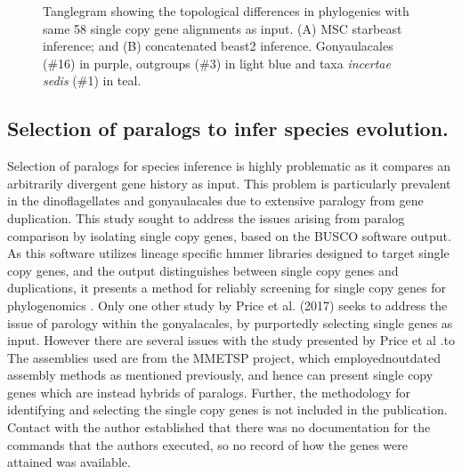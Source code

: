 \documentclass[12pt]{article}
\begin{document}

\begin{figure} 
\caption{Tanglegram showing the topological differences in phylogenies with same 58 single copy gene alignments as input. (A) MSC starbeast inference; and (B) concatenated beast2 inference. Gonyaulacales (\#16) in purple, outgroups (\#3) in light blue and taxa \textit{incertae sedis} (\#1) in teal.} 
\label{fig:tangleconcatBI}
\end{figure} 
\FloatBarrier

\subsection*{Selection of paralogs to infer species evolution.}
Selection of paralogs for species inference is highly problematic as it compares an arbitrarily divergent gene history as input. 
This problem is particularly prevalent in the dinoflagellates and gonyaulacales due to extensive paralogy from gene duplication. 
This study sought to address the issues arising from paralog comparison by isolating single copy genes, based on the BUSCO software output. 
As this software utilizes lineage specific hmmer libraries designed to target single copy genes, and the output distinguishes between single copy genes and duplications, it presents a method for reliably screening for single copy genes for phylogenomics \cite{waterhouse2017busco}.
Only one other study by Price et al. (2017) seeks to address the issue of parology within the gonyalacales, by purportedly selecting single genes as input. 
However there are several issues with the study presented by Price et al \cite{price2017robust}.to 
The assemblies used are from the MMETSP project, which employednoutdated assembly methods as mentioned previously, and hence can present single copy genes which are instead hybrids of paralogs. 
Further, the methodology for identifying and selecting the single copy genes is not included in the publication. 
Contact with the author established that there was no documentation for the commands that the authors executed, so no record of how the genes were attained was available. 
\end{document}
